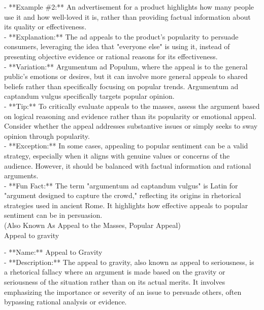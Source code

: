 \documentclass[a4paper,12pt,single,pdftex]{scrbook}
\begin{document}
    
      - **Example \#2:** An advertisement for a product highlights how many people use it and how well-loved it is, rather than providing factual information about its quality or effectiveness.
    \\

    
      - **Explanation:** The ad appeals to the product's popularity to persuade consumers, leveraging the idea that "everyone else" is using it, instead of presenting objective evidence or rational reasons for its effectiveness.
    \\

    
      - **Variation:** Argumentum ad Populum, where the appeal is to the general public's emotions or desires, but it can involve more general appeals to shared beliefs rather than specifically focusing on popular trends. Argumentum ad captandum vulgus specifically targets popular opinion.
    \\

    
      - **Tip:** To critically evaluate appeals to the masses, assess the argument based on logical reasoning and evidence rather than its popularity or emotional appeal. Consider whether the appeal addresses substantive issues or simply seeks to sway opinion through popularity.
    \\

    
      - **Exception:** In some cases, appealing to popular sentiment can be a valid strategy, especially when it aligns with genuine values or concerns of the audience. However, it should be balanced with factual information and rational arguments.
    \\

    
      - **Fun Fact:** The term "argumentum ad captandum vulgus" is Latin for "argument designed to capture the crowd," reflecting its origins in rhetorical strategies used in ancient Rome. It highlights how effective appeals to popular sentiment can be in persuasion.
    \\

  
    
      (Also Known As Appeal to the Masses, Popular Appeal)
    \\

  

Appeal to gravity
    
      - **Name:** Appeal to Gravity
    \\

    
      - **Description:** The appeal to gravity, also known as appeal to seriousness, is a rhetorical fallacy where an argument is made based on the gravity or seriousness of the situation rather than on its actual merits. It involves emphasizing the importance or severity of an issue to persuade others, often bypassing rational analysis or evidence.
    \\
\end{document}
